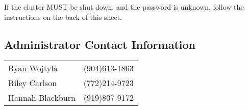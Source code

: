 \documentclass{article}
\begin{document}
\begin{large}
If the cluster MUST be shut down, and the password is unknown, follow
the instructions on the back of this sheet.
\end{large}

\pagebreak



\begin{center}
  \section*{Administrator Contact Information}
  \begin{tabular}{|l|r|}
    \hline
    Ryan Wojtyla & (904)613-1863 \\
    Riley Carlson & (772)214-9723 \\
    Hannah Blackburn & (919)807-9172 \\
    \hline
  \end{tabular}
\end{center}
\end{document}
